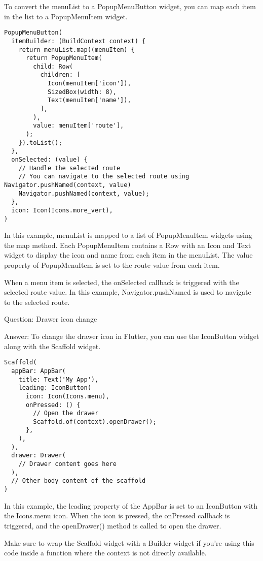 To convert the menuList to a PopupMenuButton widget, you can map each item in the list to a PopupMenuItem widget. 

\begin{lstlisting}
PopupMenuButton(
  itemBuilder: (BuildContext context) {
    return menuList.map((menuItem) {
      return PopupMenuItem(
        child: Row(
          children: [
            Icon(menuItem['icon']),
            SizedBox(width: 8),
            Text(menuItem['name']),
          ],
        ),
        value: menuItem['route'],
      );
    }).toList();
  },
  onSelected: (value) {
    // Handle the selected route
    // You can navigate to the selected route using Navigator.pushNamed(context, value)
    Navigator.pushNamed(context, value);
  },
  icon: Icon(Icons.more_vert),
)
\end{lstlisting}

In this example, menuList is mapped to a list of PopupMenuItem widgets using the map method. Each PopupMenuItem 
contains a Row with an Icon and Text widget to display the icon and name from each item in the menuList. 
The value property of PopupMenuItem is set to the route value from each item.

When a menu item is selected, the onSelected callback is triggered with the selected route value. In this example,
Navigator.pushNamed is used to navigate to the selected route.


Question: Drawer icon change

Answer: To change the drawer icon in Flutter, you can use the IconButton widget along with the Scaffold widget. 

\begin{lstlisting}
Scaffold(
  appBar: AppBar(
    title: Text('My App'),
    leading: IconButton(
      icon: Icon(Icons.menu),
      onPressed: () {
        // Open the drawer
        Scaffold.of(context).openDrawer();
      },
    ),
  ),
  drawer: Drawer(
    // Drawer content goes here
  ),
  // Other body content of the scaffold
)
\end{lstlisting}

In this example, the leading property of the AppBar is set to an IconButton with the Icons.menu icon. When the 
icon is pressed, the onPressed callback is triggered, and the openDrawer() method is called to open the drawer.

Make sure to wrap the Scaffold widget with a Builder widget if you're using this code inside a function 
where the context is not directly available.





